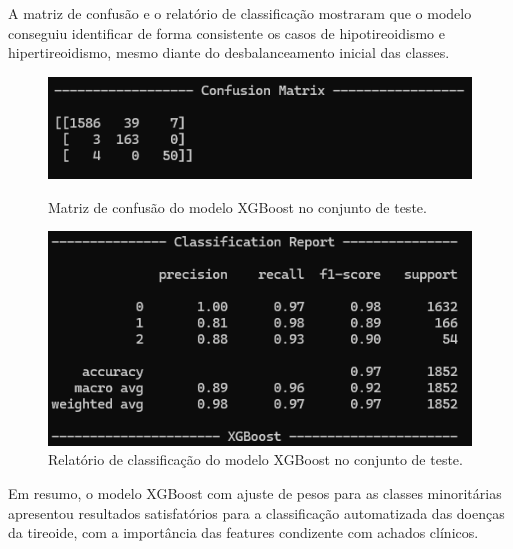 \documentclass[11pt]{article}
\begin{document}
A matriz de confusão e o relatório de classificação mostraram que o modelo conseguiu identificar de forma consistente os casos de hipotireoidismo e hipertireoidismo, mesmo diante do desbalanceamento inicial das classes.

\begin{figure}[H]
    \centering
    \begin{minipage}{0.48\textwidth}
        \centering
        \includegraphics[width=\textwidth]{img/confusion_matrix.png}
        \caption{Matriz de confusão do modelo XGBoost no conjunto de teste.}
        \label{fig:confusion_matrix}
    \end{minipage}%
    \hfill
    \begin{minipage}{0.48\textwidth}
        \centering
        \includegraphics[width=\textwidth]{img/classification_report.png}
        \caption{Relatório de classificação do modelo XGBoost no conjunto de teste.}
        \label{fig:classification_report}
    \end{minipage}
\end{figure}

Em resumo, o modelo XGBoost com ajuste de pesos para as classes minoritárias apresentou resultados satisfatórios para a classificação automatizada das doenças da tireoide, com a importância das features condizente com achados clínicos.

\end{document}
